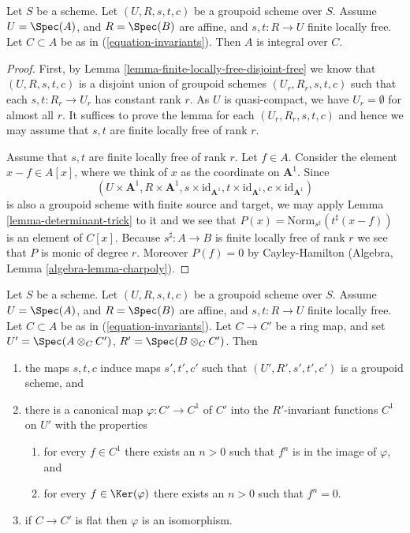 \begin{lemma}
\label{lemma-integral-over-invariants}
Let $S$ be a scheme. Let $(U, R, s, t, c)$ be a groupoid scheme over $S$.
Assume $U = \Spec(A)$, and $R = \Spec(B)$ are affine, and
$s, t : R \to U$ finite locally free.
Let $C \subset A$ be as in (\ref{equation-invariants}).
Then $A$ is integral over $C$.
\end{lemma}

\begin{proof}
First, by Lemma \ref{lemma-finite-locally-free-disjoint-free}
we know that $(U, R, s, t, c)$ is a disjoint union
of groupoid schemes $(U_r, R_r, s, t, c)$ such that each $s, t : R_r \to U_r$
has constant rank $r$. As $U$ is quasi-compact, we have $U_r = \emptyset$ for
almost all $r$. It suffices to prove the lemma for each $(U_r, R_r, s, t, c)$
and hence we may assume that $s, t$ are finite locally free of rank $r$.

\medskip\noindent
Assume that $s, t$ are finite locally free of rank $r$.
Let $f \in A$. Consider the element $x - f \in A[x]$, where we think
of $x$ as the coordinate on $\mathbf{A}^1$.
Since
$$
(U \times \mathbf{A}^1, R \times \mathbf{A}^1,
s \times \text{id}_{\mathbf{A}^1},
t \times \text{id}_{\mathbf{A}^1},
c \times \text{id}_{\mathbf{A}^1})
$$
is also a groupoid scheme with finite source and target, we may apply
Lemma \ref{lemma-determinant-trick} to it and we see that
$P(x) = \text{Norm}_{s^\sharp}(t^\sharp(x - f))$
is an element of $C[x]$. Because $s^\sharp : A \to B$ is finite locally
free of rank $r$ we see that $P$ is monic of degree $r$.
Moreover $P(f) = 0$ by Cayley-Hamilton
(Algebra, Lemma \ref{algebra-lemma-charpoly}).
\end{proof}

\begin{lemma}
\label{lemma-invariants-base-change}
Let $S$ be a scheme. Let $(U, R, s, t, c)$ be a groupoid scheme over $S$.
Assume $U = \Spec(A)$, and $R = \Spec(B)$ are affine, and
$s, t : R \to U$ finite locally free. Let $C \subset A$ be as in
(\ref{equation-invariants}). Let $C \to C'$ be a ring map, and set
$U' = \Spec(A \otimes_C C')$,
$R' = \Spec(B \otimes_C C')$.
Then
\begin{enumerate}
\item the maps $s, t, c$ induce maps $s', t', c'$ such that
$(U', R', s', t', c')$ is a groupoid scheme, and
\item there is a canonical map $\varphi : C' \to C^1$ of $C'$ into
the $R'$-invariant functions $C^1$ on $U'$ with the properties
\begin{enumerate}
\item for every $f \in C^1$ there exists an $n > 0$ such that
$f^n$ is in the image of $\varphi$, and
\item for every $f \in \Ker(\varphi)$ there exists
an $n > 0$ such that $f^n = 0$.
\end{enumerate}
\item if $C \to C'$ is flat then $\varphi$ is an isomorphism.
\end{enumerate}
\end{lemma}

